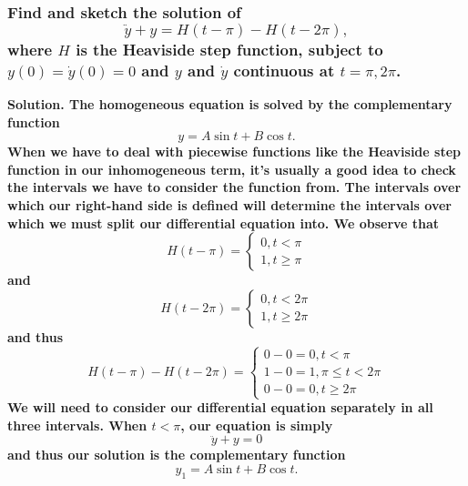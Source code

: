 \documentclass{article}
\begin{document}
\subsubsection*{Find and sketch the solution of \begin{equation*}
    \ddot{y} + y = H(t-\pi) -H(t-2\pi),
\end{equation*}
where $H$ is the Heaviside step function, subject to $y(0)=\dot{y}(0)=0$ and $y$ and $\dot{y}$ continuous at $t=\pi, 2\pi$.
}
\bf Solution. \normalfont The homogeneous equation is solved by the complementary function 
\begin{equation*}
    y = A \sin t + B \cos t.
\end{equation*}
When we have to deal with piecewise functions like the Heaviside step function in our inhomogeneous term, it's usually a good idea to check the intervals we have to consider the function from. The intervals over which our right-hand side is defined will determine the intervals over which we must split our differential equation into. We observe that 
\begin{equation*}
    H(t-\pi)=
    \begin{cases}
        0, t<\pi \\
        1, t\geq \pi
    \end{cases}
\end{equation*}
and
\begin{equation*}
    H(t-2\pi)=
    \begin{cases}
        0, t<2\pi \\
        1, t\geq 2\pi
    \end{cases}
\end{equation*}
and thus 
\begin{equation*}
    H(t-\pi)-H(t-2\pi) =
    \begin{cases}
        0-0=0, t<\pi \\
        1-0=1, \pi\leq t < 2\pi \\
        0-0=0, t\geq 2\pi
    \end{cases}
\end{equation*}
We will need to consider our differential equation separately in all three intervals. When $t<\pi$, our equation is simply 
\begin{equation*}
    \ddot{y}+y = 0
\end{equation*}
and thus our solution is the complementary function
\begin{equation*}
    y_1 = A \sin t + B \cos t.
\end{equation*}
\end{document}
